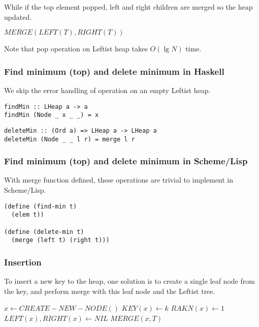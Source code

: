 \documentclass{article}
\begin{document}
While if the top element popped, left and right children are merged
so the heap updated.

\begin{algorithmic}[1]
  \State \Return $MERGE(LEFT(T), RIGHT(T))$
\EndFunction
\end{algorithmic}

Note that pop operation on Leftist heap takes $O(\lg N)$ time.

\subsubsection*{Find minimum (top) and delete minimum in Haskell}

We skip the error handling of operation on an empty
Leftist heap.

\lstset{language=Haskell}
\begin{lstlisting}
findMin :: LHeap a -> a
findMin (Node _ x _ _) = x
\end{lstlisting}

\begin{lstlisting}
deleteMin :: (Ord a) => LHeap a -> LHeap a
deleteMin (Node _ _ l r) = merge l r
\end{lstlisting}

\subsubsection*{Find minimum (top) and delete minimum in Scheme/Lisp}

With merge function defined, these operations are trivial to implement
in Scheme/Lisp.

\lstset{language=lisp}
\begin{lstlisting}
(define (find-min t)
  (elem t))

(define (delete-min t)
  (merge (left t) (right t)))
\end{lstlisting}

\subsubsection{Insertion}

To insert a new key to the heap, one solution is to create a single
leaf node from the key, and perform merge with this leaf node and
the Leftist tree.

\begin{algorithmic}[1]
  \State $x \gets CREATE-NEW-NODE()$
  \State $KEY(x) \gets k$
  \State $RAKN(x) \gets 1$
  \State $LEFT(x), RIGHT(x) \gets NIL$
  \State \Return $MERGE(x, T)$
\EndFunction
\end{algorithmic}
\end{document}
